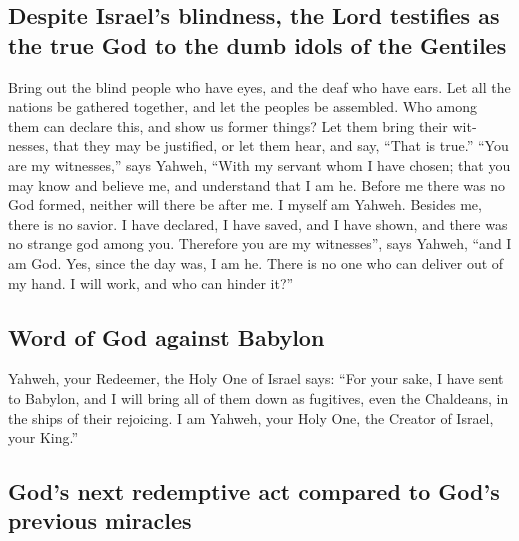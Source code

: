 \begin{paracol}{2}
\begin{otherlanguage}{english}
\hypertarget{despite-israels-blindness-the-lord-testifies-as-the-true-god-to-the-dumb-idols-of-the-gentiles}{%
\subsection{Despite Israel's blindness, the Lord testifies as the true
God to the dumb idols of the
Gentiles}\label{despite-israels-blindness-the-lord-testifies-as-the-true-god-to-the-dumb-idols-of-the-gentiles}}

 Bring out the blind people who have eyes, and the deaf
who have ears.  Let all the nations be gathered together,
and let the peoples be assembled. Who among them can declare this, and
show us former things? Let them bring their witnesses, that they may be
justified, or let them hear, and say, ``That is true.'' 
``You are my witnesses,'' says Yahweh, ``With my servant whom I have
chosen; that you may know and believe me, and understand that I am he.
Before me there was no God formed, neither will there be after me.
 I myself am Yahweh. Besides me, there is no savior.
 I have declared, I have saved, and I have shown, and
there was no strange god among you. Therefore you are my witnesses'',
says Yahweh, ``and I am God.  Yes, since the day was, I
am he. There is no one who can deliver out of my hand. I will work, and
who can hinder it?''

\hypertarget{word-of-god-against-babylon}{%
\subsection{Word of God against
Babylon}\label{word-of-god-against-babylon}}

 Yahweh, your Redeemer, the Holy One of Israel says:
``For your sake, I have sent to Babylon, and I will bring all of them
down as fugitives, even the Chaldeans, in the ships of their rejoicing.
 I am Yahweh, your Holy One, the Creator of Israel, your
King.''

\hypertarget{gods-next-redemptive-act-compared-to-gods-previous-miracles}{%
\subsection{God's next redemptive act compared to God's previous
miracles}\label{gods-next-redemptive-act-compared-to-gods-previous-miracles}}


\end{otherlanguage}
\end{paracol}
